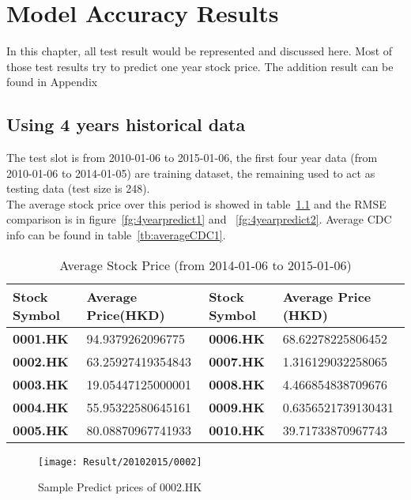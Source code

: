 \chapter{Model Accuracy Results}
\label{ch:AccuracyResult}
In this chapter, all test result would be represented and discussed here. Most of those test results try to predict one year stock price. The addition result can be found in Appendix~


\section{Using 4 years historical data}

The test slot is from 2010-01-06 to 2015-01-06, the first four year data (from 2010-01-06 to 2014-01-05) are training dataset, the remaining used to act as testing data (test size is 248).\\


The average stock price over this period is showed in table~\ref{tb:avg20142015} and the RMSE comparison is in figure~\ref{fg:4yearpredict1} and ~\ref{fg:4yearpredict2}. Average CDC info can be found in table~\ref{tb:averageCDC1}.\\


\begin{table}[h]
	\centering
	\begin{tabular}{|l|l|l|l|}
		\hline
		\textbf{Stock Symbol} & \textbf{Average Price(HKD)} & \textbf{Stock Symbol} & \textbf{Average Price (HKD)} \\ \hline
		\textbf{0001.HK}      & 94.9379262096775       & \textbf{0006.HK}      & 68.62278225806452      \\ \hline
		\textbf{0002.HK}      & 63.25927419354843      & \textbf{0007.HK}      & 1.316129032258065      \\ \hline
		\textbf{0003.HK}      & 19.05447125000001      & \textbf{0008.HK}      & 4.466854838709676      \\ \hline
		\textbf{0004.HK}      & 55.95322580645161      & \textbf{0009.HK}      & 0.6356521739130431     \\ \hline
		\textbf{0005.HK}      & 80.08870967741933      & \textbf{0010.HK}      & 39.71733870967743      \\ \hline
	\end{tabular}
	\caption{Average Stock Price (from 2014-01-06 to 2015-01-06)}
	\label{tb:avg20142015}
\end{table}

\begin{figure}[h]
	\centering
	\texttt{[image: Result/20102015/0002]}
	\caption{Sample Predict prices of 0002.HK}
\end{figure}

